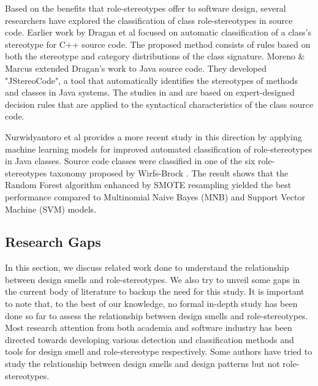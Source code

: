 \documentclass[AMA,Times1COL]{WileyNJDv5} %
\begin{document}
Based on the benefits that role-stereotypes offer to software design, several researchers have explored the classification of class role-stereotypes in source code. Earlier work by Dragan et al \cite{dragan2010automatic} focused on automatic classification of a class's stereotype for C++ source code. The proposed method consists of rules based on both the stereotype and category distributions of the class signature. Moreno \& Marcus\cite{moreno2012jstereocode} extended Dragan's work to Java source code. 
They developed "JStereoCode", a tool that automatically identifies the stereotypes of methods and classes in Java systems. The studies in \cite{dragan2010automatic} and \cite{moreno2012jstereocode} are based on expert-designed decision rules that are applied to the syntactical characteristics of the class source code.

Nurwidyantoro et al \cite{nurwidyantoro2019automated} provides a more recent study in this direction by applying machine learning models for improved automated classification of role-stereotypes in Java classes. Source code classes were classified in one of the six role-stereotypes taxonomy proposed by Wirfs-Brock \cite{wirfs2006characterizing}. The result shows that the Random Forest algorithm enhanced by SMOTE resampling yielded the best performance compared to Multinomial Naive Bayes (MNB) and Support Vector Machine (SVM) models.


\subsection{Research Gaps}
In this section, we discuss related work done to understand the relationship between design smells and role-stereotypes. We also try to unveil some gaps in the current body of literature to backup the need for this study. It is important to note that, to the best of our knowledge, no formal in-depth study has been done so far to assess the relationship between design smells and role-stereotypes. Most research attention from both academia and software industry has been directed towards developing various detection and classification methods and tools for design smell and role-stereotype respectively. Some authors have tried to study the relationship between design smells and design patterns \cite{jaafar2014analysing, walter2016relationship, sousa2018systematic, santos2022building} but not role-stereotypes.
\end{document}
